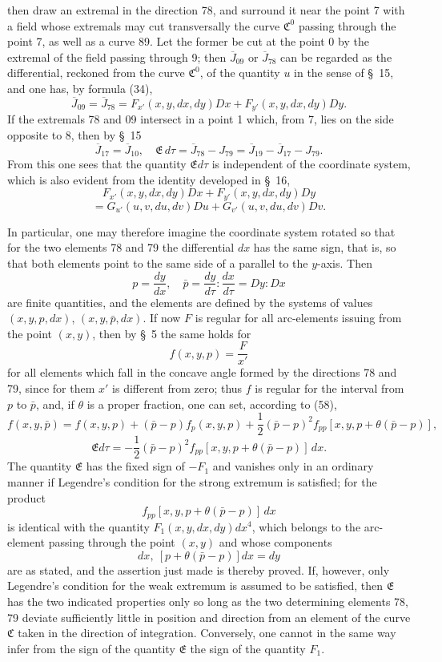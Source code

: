 \documentclass[11pt,a4paper,leqno]{article}
\begin{document}
 then draw an extremal in the direction 78, and surround it near the point 7 with a field whose extremals may cut transversally the curve $\mathfrak{C}^0$ passing through the point 7, as well as a curve 89. Let the former be cut at the point 0 by the extremal of the field passing through 9; then $\overline{J}_{09}$ or $\overline{J}_{78}$ can be regarded as the differential, reckoned from the curve $\mathfrak{C}^0$, of the quantity $u$ in the sense of
\S~15, and one has, by formula (34),
\[
\overline{J}_{09}=\overline{J}_{78}
=
F_{x'}(x,y,dx,dy)D x+F_{y'}(x,y,dx,dy)D y.
\]
If the extremals 78 and 09 intersect in a point 1 which, from 7, lies on the side opposite to 8, then by \S~15
\[
\overline{J}_{17}=\overline{J}_{10},\quad
\mathfrak{E}\,d\tau
=
\overline{J}_{78}-J_{79}
=
\overline{J}_{19}-\overline{J}_{17}-J_{79}.
\]
From this one sees that the quantity $\mathfrak{E}d\tau$ is independent of the coordinate system, which is also evident from the identity developed in \S~16,
\[
F_{x'}(x,y,dx,dy)D x+F_{y'}(x,y,dx,dy)D y
\]
\[
=
G_{u'}(u,v,du,dv)D u+G_{v'}(u,v,du,dv)D v.
\]

In particular, one may therefore imagine the coordinate system rotated so that for the two elements 78 and 79 the differential $dx$ has the same sign, that is, so that both elements point to the same side of a parallel to the $y$-axis. Then
\[
p=\frac{dy}{dx},\quad
\bar{p}=\frac{dy}{d\tau}:\frac{dx}{d\tau}=D y:D x
\]
are finite quantities, and the elements are defined by the systems of values $(x,y,p,dx)$, $(x,y,\bar{p},dx)$. If now $F$ is regular for all arc-elements issuing from the point $(x,y)$, then by \S~5 the same holds for
\[
f(x,y,p)=\frac{F}{x'}
\]
for all elements which fall in the concave angle formed by the directions 78 and 79, since for them $x'$ is different from zero; thus $f$ is regular for the interval from $p$ to $\bar{p}$, and, if $\theta$ is a proper fraction, one can set, according to (58),
\[
f(x,y,\bar{p})=f(x,y,p)+(\bar{p}-p)f_p(x,y,p)
+\frac{1}{2}(\bar{p}-p)^2 f_{pp}[x,y,p+\theta(\bar{p}-p)],
\]
\begin{equation}\tag{60}
\mathfrak{E}d\tau
=
-\frac{1}{2}(\bar{p}-p)^2 f_{pp}[x,y,p+\theta(\bar{p}-p)]\,dx.
\end{equation}
The quantity $\mathfrak{E}$ has the fixed sign of $-F_1$ and vanishes only in an ordinary manner if Legendre's condition for the strong extremum is satisfied; for the product
\[
f_{pp}[x,y,p+\theta(\bar{p}-p)]\,dx
\]
is identical with the quantity $F_1(x,y,dx,dy)dx^4$, which belongs to the arc-element passing through the point $(x,y)$ and whose components
\[
dx,\ [p+\theta(\bar{p}-p)]dx=dy
\]
are as stated, and the assertion just made is thereby proved. If, however, only Legendre's condition for the weak extremum is assumed to be satisfied, then $\mathfrak{E}$ has the two indicated properties only so long as the two determining elements 78, 79 deviate sufficiently little in position and direction from an element of the curve $\mathfrak{C}$ taken in the direction of integration. Conversely, one cannot in the same way infer from the sign of the quantity $\mathfrak{E}$ the sign of the quantity $F_1$.
\end{document}
